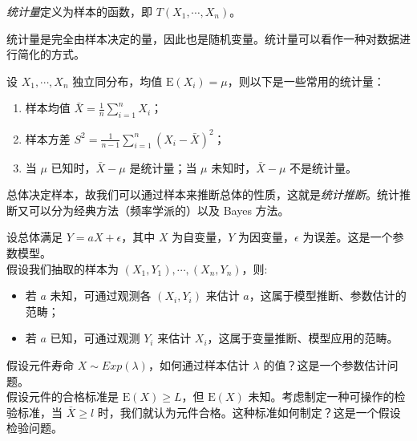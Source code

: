 \documentclass[../main.tex]{subfiles}
\begin{document}
\begin{definition*}\label{def:6.0.1}
    \emph{统计量}定义为样本的函数，即 $T(X_1,\cdots,X_n)$。
\end{definition*}

统计量是完全由样本决定的量，因此也是随机变量。统计量可以看作一种对数据进行简化的方式。

\begin{example*}
    设 $X_1,\cdots,X_n$ 独立同分布，均值 $\mathrm E(X_i)=\mu$，则以下是一些常用的统计量：
    \begin{enumerate}
        \item 样本均值 $\bar X=\frac1n\sum_{i=1}^nX_i$；
        \item 样本方差 $S^2=\frac1{n-1}\sum_{i=1}^n(X_i-\bar X)^2$；
        \item 当 $\mu$ 已知时，$\bar X-\mu$ 是统计量；当 $\mu$ 未知时，$\bar X-\mu$ 不是统计量。
    \end{enumerate}
\end{example*}

总体决定样本，故我们可以通过样本来推断总体的性质，这就是\emph{统计推断}。统计推断又可以分为经典方法（频率学派的）以及 Bayes 方法。

\begin{example*}
    设总体满足 $Y=aX+\epsilon$，其中 $X$ 为自变量，$Y$ 为因变量，$\epsilon$ 为误差。这是一个参数模型。\\
    假设我们抽取的样本为 $(X_1,Y_1),\cdots,(X_n,Y_n)$，则:
    \begin{itemize}
        \item 若 $a$ 未知，可通过观测各 $(X_i,Y_i)$ 来估计 $a$，这属于模型推断、参数估计的范畴；
        \item 若 $a$ 已知，可通过观测 $Y_i$ 来估计 $X_i$，这属于变量推断、模型应用的范畴。
    \end{itemize}
\end{example*}

\begin{example*}
    假设元件寿命 $X\sim Exp(\lambda)$，如何通过样本估计 $\lambda$ 的值？这是一个参数估计问题。\\
    假设元件的合格标准是 $\mathrm E(X)\geq L$，但 $\mathrm E(X)$ 未知。考虑制定一种可操作的检验标准，当 $\bar X\geq l$ 时，我们就认为元件合格。这种标准如何制定？这是一个假设检验问题。
\end{example*}
\end{document}
